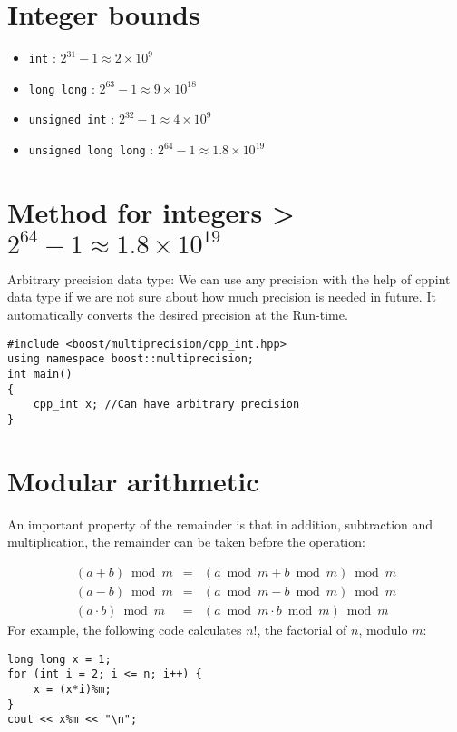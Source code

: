 \documentclass[twoside,12pt,a4paper,english]{book}
\theoremstyle{definition}
\theoremstyle{problemstyle}
\begin{document}
\section{Integer bounds}

\begin{itemize}
    \item\texttt{int} :  $2^{31} - 1 \approx 2\times10^9$
    \item\texttt{long long} :  $2^{63} - 1 \approx 9\times10^{18}$
    \item\texttt{unsigned int} :  $2^{32} - 1 \approx 4\times10^9$
    \item\texttt{unsigned long long} :  $2^{64} - 1 \approx 1.8\times10^{19}$
\end{itemize}

\section{Method for integers > $2^{64} - 1 \approx 1.8\times10^{19}$}

Arbitrary precision data type: We can use any precision with the help of cppint data type if we are not sure about how much precision is needed in future. It automatically converts the desired precision at the Run-time.

\begin{lstlisting}
#include <boost/multiprecision/cpp_int.hpp>
using namespace boost::multiprecision;
int main()
{
    cpp_int x; //Can have arbitrary precision
}
\end{lstlisting}

\section{Modular arithmetic}

An important property of the remainder is that
in addition, subtraction and multiplication,
the remainder can be taken before the operation:

\[
\begin{array}{rcr}
(a+b) \bmod m & = & (a \bmod m + b \bmod m) \bmod m \\
(a-b) \bmod m & = & (a \bmod m - b \bmod m) \bmod m \\
(a \cdot b) \bmod m & = & (a \bmod m \cdot b \bmod m) \bmod m
\end{array}
\]
\linebreak
\linebreak
\linebreak
\linebreak
For example, the following code calculates $n!$,
the factorial of $n$, modulo $m$:
\begin{lstlisting}
long long x = 1;
for (int i = 2; i <= n; i++) {
    x = (x*i)%m;
}
cout << x%m << "\n";
\end{lstlisting}
\end{document}
